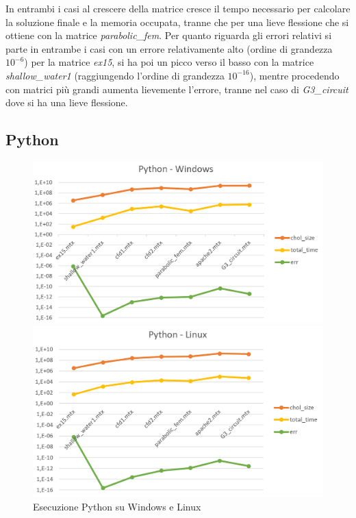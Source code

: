 \documentclass[a4paper,12pt]{article}
\begin{document}
\bigskip

In entrambi i casi al crescere della matrice cresce il tempo necessario per calcolare la soluzione finale e la memoria occupata, tranne che per una lieve flessione che si ottiene con la matrice \textit{parabolic\_fem}. 
Per quanto riguarda gli errori relativi si parte in entrambe i casi con un errore relativamente alto (ordine di grandezza $10^{-6}$) per la matrice \textit{ex15}, si ha poi un picco verso il basso con la matrice \textit{shallow\_water1} (raggiungendo l’ordine di grandezza $10^{-16}$), mentre procedendo con matrici più grandi aumenta lievemente l’errore, tranne nel caso di \textit{G3\_circuit} dove si ha una lieve flessione. 

\newpage

\subsection{Python}

\begin{figure}[H]
\centering
\begin{minipage}{.5\textwidth}
  \centering
  \includegraphics[width=1\linewidth]{img/pythonwin.png}
\end{minipage}%
\begin{minipage}{.5\textwidth}
  \centering
  \includegraphics[width=1\linewidth]{img/pythonlinux.png}
\end{minipage}
\caption{Esecuzione Python su Windows e Linux}
\end{figure}
\end{document}
